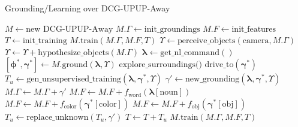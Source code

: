 \begin{algorithm}[b!]\footnotesize
\caption{Grounding/Learning over DCG-UPUP-Away}\label{alg:dcg_upup_away}
\begin{algorithmic}[1]
\State $M \gets \text{new DCG-UPUP-Away}$
\State $M.\Gamma \gets \text{init\_groundings}$
\State $M.F \gets \text{init\_features}$
\State $T \gets \text{init\_training}$
\State $M.\text{train}(M.\Gamma, M.F, T)$
\State $\Upsilon \gets \text{perceive\_objects}(\text{camera},M.\Gamma)$
\State $\Upsilon \gets \Upsilon + \text{hypothesize\_objects}(M.\Gamma)$
\State $\boldsymbol{\lambda} \gets \text{get\_nl\_command}()$
\State $[\boldsymbol{\phi}^*,\boldsymbol{\gamma}^*] \gets M.\text{ground}(\boldsymbol{\lambda},\Upsilon)$
\State $\text{explore\_surroundings()}$
\Else
\State $\text{drive\_to}(\boldsymbol{\gamma}^*)$
\EndIf
\State $T_u \gets \text{gen\_unsupervised\_training}(\boldsymbol{\lambda},\boldsymbol{\gamma}^*,\Upsilon)$
\State $\gamma' \gets \text{new\_grounding}(\boldsymbol{\lambda},\boldsymbol{\gamma}^*,\Upsilon)$
\State $M.\Gamma \gets M.\Gamma + \gamma'$
\State $M.F \gets M.F + f_{\text{word}}(\boldsymbol{\lambda}[\text{noun}])$
\State $M.F \gets M.F + f_{\text{color}}(\boldsymbol{\gamma}^*[\text{color}])$
\State $M.F \gets M.F + f_{\text{obj}}(\boldsymbol{\gamma}^*[\text{obj}])$
\State $T_u \gets \text{replace\_unknown}(T_u,\gamma')$
\EndIf
\State $T \gets T + T_u$
\State $M.\text{train}(M.\Gamma, M.F, T)$
\EndWhile
\EndProcedure
\end{algorithmic}
\end{algorithm}
